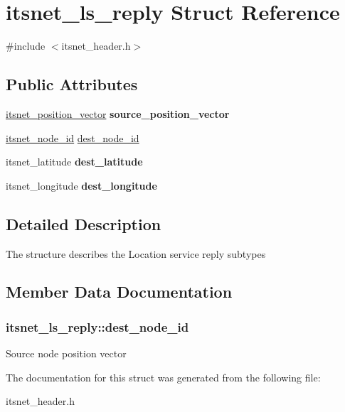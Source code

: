 \hypertarget{structitsnet__ls__reply}{\section{itsnet\-\_\-ls\-\_\-reply \-Struct \-Reference}
\label{structitsnet__ls__reply}
}


{\ttfamily \#include $<$itsnet\-\_\-header.\-h$>$}

\subsection*{\-Public \-Attributes}
\begin{DoxyCompactItemize}
\item 
\hypertarget{structitsnet__ls__reply_a7a6fa60a2894325fbf049b867b25af05}{\hyperlink{structitsnet__position__vector}{itsnet\-\_\-position\-\_\-vector} {\bfseries source\-\_\-position\-\_\-vector}}\label{structitsnet__ls__reply_a7a6fa60a2894325fbf049b867b25af05}

\item 
\hyperlink{structitsnet__node__id}{itsnet\-\_\-node\-\_\-id} \hyperlink{structitsnet__ls__reply_a9f0213dc288963d8677881a002c39d3c}{dest\-\_\-node\-\_\-id}
\item 
\hypertarget{structitsnet__ls__reply_a5230b3146b739177cef37e475204c7ab}{itsnet\-\_\-latitude {\bfseries dest\-\_\-latitude}}\label{structitsnet__ls__reply_a5230b3146b739177cef37e475204c7ab}

\item 
\hypertarget{structitsnet__ls__reply_a6eb2db3ab91a9949606cacb80bc402b5}{itsnet\-\_\-longitude {\bfseries dest\-\_\-longitude}}\label{structitsnet__ls__reply_a6eb2db3ab91a9949606cacb80bc402b5}

\end{DoxyCompactItemize}


\subsection{\-Detailed \-Description}
\-The structure describes the \-Location service reply subtypes 

\subsection{\-Member \-Data \-Documentation}
\hypertarget{structitsnet__ls__reply_a9f0213dc288963d8677881a002c39d3c}{
\subsubsection[{dest\-\_\-node\-\_\-id}]{ {\bf itsnet\-\_\-ls\-\_\-reply\-::dest\-\_\-node\-\_\-id}}}\label{structitsnet__ls__reply_a9f0213dc288963d8677881a002c39d3c}
\-Source node position vector 

\-The documentation for this struct was generated from the following file\-:\begin{DoxyCompactItemize}
\item 
itsnet\-\_\-header.\-h\end{DoxyCompactItemize}
